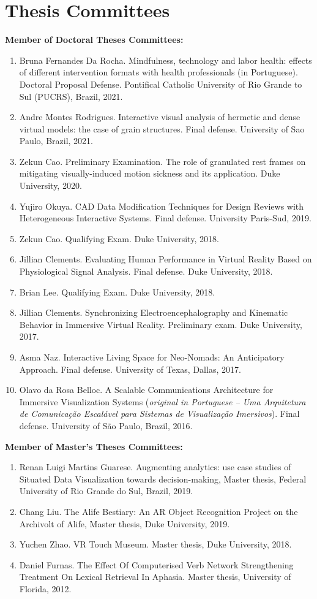 \documentclass[wideaddress]{vitae}
\let\olditem\item
\def\item{\nopagebreak[4]\olditem}%
\newcommand{\resitem}[1]{
	\item \begin{flushleft} #1 \end{flushleft}
}
\newenvironment{resnumberedlist}[1]{
	\resitem{\textbf{#1}}
	\begin{enumerate}
}{
	\end{enumerate}
}
\begin{document}
\section{Thesis Committees}
\begin{description}
	\begin{resnumberedlist}{Member of Doctoral Theses Committees:}
	\resitem{Bruna Fernandes Da Rocha. Mindfulness, technology and labor health: effects of different intervention formats with health professionals (in Portuguese). Doctoral Proposal Defense. Pontifical Catholic University of Rio Grande to Sul (PUCRS), Brazil, 2021.}
	\resitem{Andre Montes Rodrigues. Interactive visual analysis of hermetic and dense virtual models: the case of grain structures. Final defense. University of Sao Paulo, Brazil, 2021.}
	\resitem{Zekun Cao. Preliminary Examination. The role of granulated rest frames on mitigating visually-induced motion sickness and its application. Duke University, 2020.}
\resitem{Yujiro Okuya. CAD Data Modification Techniques for Design Reviews with Heterogeneous Interactive Systems. Final defense. University Paris-Sud, 2019.}
	\resitem{Zekun Cao. Qualifying Exam. Duke University, 2018.}
	\resitem{Jillian Clements. Evaluating Human Performance in Virtual Reality Based on Physiological Signal Analysis. Final defense. Duke University, 2018.}
	\resitem{Brian Lee. Qualifying Exam. Duke University, 2018.}
	\resitem{Jillian Clements. Synchronizing Electroencephalography and Kinematic Behavior in Immersive Virtual Reality. Preliminary exam. Duke University, 2017.}
	\resitem{Asma Naz. Interactive Living Space for Neo-Nomads: An Anticipatory Approach. Final defense. University of Texas, Dallas, 2017.}
	\resitem{Olavo da Rosa Belloc. A Scalable Communications Architecture for Immersive Visualization Systems (\textit{original in Portuguese -- Uma Arquitetura de Comunica\c{c}\~ao Escal\'avel para Sistemas de Visualiza\c{c}\~ao Imersivos}). Final defense. University of S\~ao Paulo, Brazil, 2016.}
	\end{resnumberedlist}

	\begin{resnumberedlist}{Member of Master's Theses Committees:}
	\resitem{Renan Luigi Martins Guarese. Augmenting analytics: use case studies of Situated Data Visualization towards decision-making, Master thesis, Federal University of Rio Grande do Sul, Brazil, 2019.}
	\resitem{Chang Liu. The Alife Bestiary: An AR Object Recognition Project on the Archivolt of Alife, Master thesis, Duke University, 2019.}
	\resitem{Yuchen Zhao. VR Touch Museum. Master thesis, Duke University, 2018.}
	\resitem{Daniel Furnas. The Effect Of Computerised Verb Network Strengthening Treatment On Lexical Retrieval In Aphasia. Master thesis, University of Florida, 2012.}
	\end{resnumberedlist}
	

\end{description}
\end{document}
